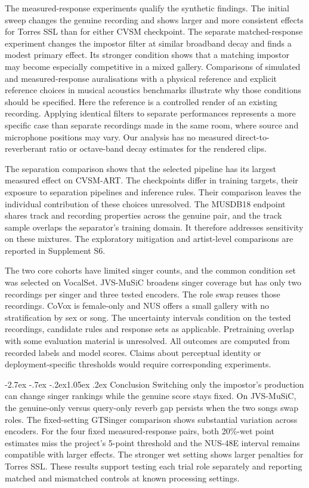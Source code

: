 \documentclass[10pt,a4paper]{article}
\makeatletter
\renewcommand\section{\@startsection{section}{1}{\z@}%
  {-2.7ex \@plus -.7ex \@minus -.2ex}{1.05ex \@plus .2ex}%
  {\normalfont\large\sffamily\bfseries}}
\makeatother
\begin{document}
The measured-response experiments qualify the synthetic findings. The initial sweep changes the genuine recording and shows larger and more consistent effects for Torres SSL than for either CVSM checkpoint. The separate matched-response experiment changes the impostor filter at similar broadband decay and finds a modest primary effect. Its stronger condition shows that a matching impostor may become especially competitive in a mixed gallery. Comparisons of simulated and measured-response auralisations with a physical reference \cite{starz} and explicit reference choices in musical acoustics benchmarks \cite{ernoult} illustrate why those conditions should be specified. Here the reference is a controlled render of an existing recording. Applying identical filters to separate performances represents a more specific case than separate recordings made in the same room, where source and microphone positions may vary. Our analysis has no measured direct-to-reverberant ratio or octave-band decay estimates for the rendered clips.

The separation comparison shows that the selected pipeline has its largest measured effect on CVSM-ART. The checkpoints differ in training targets, their exposure to separation pipelines and inference rules. Their comparison leaves the individual contribution of these choices unresolved. The MUSDB18 endpoint shares track and recording properties across the genuine pair, and the track sample overlaps the separator's training domain. It therefore addresses sensitivity on these mixtures. The exploratory mitigation and artist-level comparisons are reported in Supplement S6.

The two core cohorts have limited singer counts, and the common condition set was selected on VocalSet. JVS-MuSiC broadens singer coverage but has only two recordings per singer and three tested encoders. The role swap reuses those recordings. CoVox is female-only and NUS offers a small gallery with no stratification by sex or song. The uncertainty intervals condition on the tested recordings, candidate rules and response sets as applicable. Pretraining overlap with some evaluation material is unresolved. All outcomes are computed from recorded labels and model scores. Claims about perceptual identity or deployment-specific thresholds would require corresponding experiments.

\section{Conclusion}
Switching only the impostor's production can change singer rankings while the genuine score stays fixed. On JVS-MuSiC, the genuine-only versus query-only reverb gap persists when the two songs swap roles. The fixed-setting GTSinger comparison shows substantial variation across encoders. For the four fixed measured-response pairs, both 20\%-wet point estimates miss the project's 5-point threshold and the NUS-48E interval remains compatible with larger effects. The stronger wet setting shows larger penalties for Torres SSL. These results support testing each trial role separately and reporting matched and mismatched controls at known processing settings.
\end{document}
